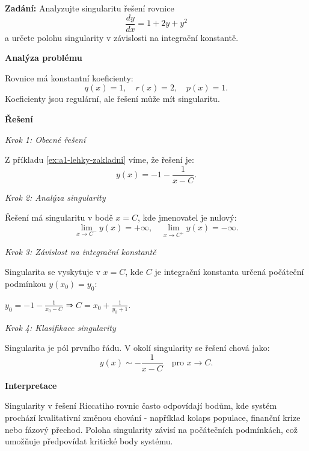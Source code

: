 \vspace{2\baselineskip}

\begin{example}
\label{ex:b3-stredni-singularita-reseni}

\noindent\textbf{Zadání:} Analyzujte singularitu řešení rovnice
\[
\frac{dy}{dx} = 1 + 2y + y^2
\]
a určete polohu singularity v závislosti na integrační konstantě.

\vspace{1.5\baselineskip}

\noindent\textbf{Analýza problému}

\noindent Rovnice má konstantní koeficienty:
\[
q(x) = 1, \quad r(x) = 2, \quad p(x) = 1.
\]
Koeficienty jsou regulární, ale řešení může mít singularitu.

\vspace{1.5\baselineskip}

\noindent\textbf{Řešení}

\noindent\textit{Krok 1: Obecné řešení}

Z příkladu \ref{ex:a1-lehky-zakladni} víme, že řešení je:
\[
y(x) = -1 - \frac{1}{x - C}.
\]

\noindent\textit{Krok 2: Analýza singularity}

Řešení má singularitu v bodě $x = C$, kde jmenovatel je nulový:
\[
\lim_{x \to C^-} y(x) = +\infty, \quad \lim_{x \to C^+} y(x) = -\infty.
\]

\noindent\textit{Krok 3: Závislost na integrační konstantě}

Singularita se vyskytuje v $x = C$, kde $C$ je integrační konstanta 
určená počáteční podmínkou $y(x_0) = y_0$:

$y_0 = -1 - \frac{1}{x_0 - C}$ ⇒ $C = x_0 + \frac{1}{y_0 + 1}$.

\noindent\textit{Krok 4: Klasifikace singularity}

Singularita je pól prvního řádu. V okolí singularity se řešení chová jako:
\[
y(x) \sim -\frac{1}{x - C} \quad \text{pro } x \to C.
\]

\vspace{1.5\baselineskip}

\noindent\textbf{Interpretace}

Singularity v řešení Riccatiho rovnic často odpovídají bodům, kde systém 
prochází kvalitativní změnou chování - například kolaps populace, finanční 
krize nebo fázový přechod. Poloha singularity závisí na počátečních podmínkách, 
což umožňuje předpovídat kritické body systému.

\end{example}

